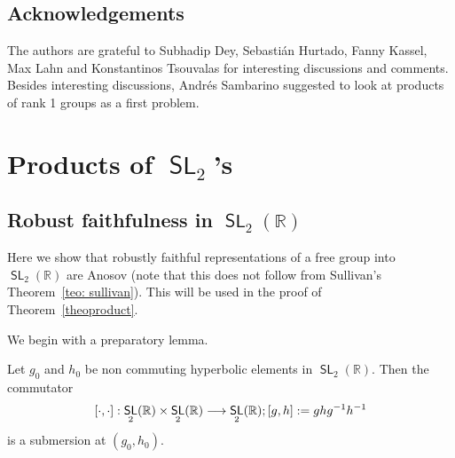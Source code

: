 \documentclass[AHL,Unicode,longabstracts]{cedram}
\DeclareMathOperator{\SL}{\mathsf{SL}}
\newcommand{\R}{\mathbb{R}}
\renewcommand*{\to}{\mathchoice{\longrightarrow}{\rightarrow}{\rightarrow}{\rightarrow}}
\begin{document}
\subsection*{Acknowledgements}
The authors are grateful to Subhadip Dey, Sebastián Hurtado, Fanny Kassel, Max Lahn and Konstantinos Tsouvalas for interesting discussions and comments. Besides interesting discussions, Andrés Sambarino suggested to look at products of rank 1 groups as a first problem.



\section{Products of \texorpdfstring{$\SL_2$}{SL\_2}'s}\label{sec: products}

\subsection{Robust faithfulness in $\SL_2(\R)$}\label{ss.SL2}

Here we show that robustly faithful representations of a free group into $\SL_2(\R)$ are Anosov (note that this does not follow from Sullivan's Theorem~\ref{teo: sullivan}). This will be used in the proof of Theorem~\ref{theoproduct}.

We begin with a preparatory lemma.


\begin{lemm}\label{lem: commutator is submersion}
Let $g_0$ and $h_0$ be non commuting hyperbolic elements in $\SL_2(\R)$.
Then the commutator
\[
[\cdot,\cdot]:\SL_2(\R)\times\SL_2(\R)\to\SL_2(\R); [g,h]:=ghg^{-1}h^{-1}
\]
is a submersion at $(g_0,h_0)$.
\end{lemm}
\end{document}
